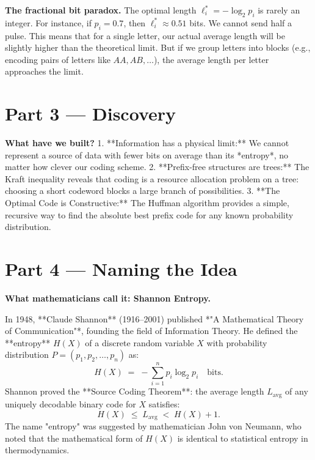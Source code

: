 \begin{thought}
\textbf{The fractional bit paradox.}
The optimal length $\ell_i^* = -\log_2 p_i$ is rarely an integer. For instance, if $p_i = 0.7$, then $\ell_i^* \approx 0.51$ bits. We cannot send half a pulse. This means that for a single letter, our actual average length will be slightly higher than the theoretical limit. But if we group letters into blocks (e.g., encoding pairs of letters like $AA, AB, \ldots$), the average length per letter approaches the limit.
\end{thought}

\section{Part 3 \texorpdfstring{---}{--} Discovery}

\begin{discoverybox}
\textbf{What have we built?}
1. **Information has a physical limit:** We cannot represent a source of data with fewer bits on average than its *entropy*, no matter how clever our coding scheme.
2. **Prefix-free structures are trees:** The Kraft inequality reveals that coding is a resource allocation problem on a tree: choosing a short codeword blocks a large branch of possibilities.
3. **The Optimal Code is Constructive:** The Huffman algorithm provides a simple, recursive way to find the absolute best prefix code for any known probability distribution.
\end{discoverybox}

\section{Part 4 \texorpdfstring{---}{--} Naming the Idea}

\begin{namebox}
\textbf{What mathematicians call it: Shannon Entropy.}

In 1948, **Claude Shannon** (1916–2001) published *"A Mathematical Theory of Communication"*, founding the field of Information Theory. He defined the **entropy** $H(X)$ of a discrete random variable $X$ with probability distribution $P = (p_1, p_2, \ldots, p_n)$ as:
\[
  H(X) \;=\; -\sum_{i=1}^{n} p_i \log_2 p_i \quad \text{bits}.
\]
Shannon proved the **Source Coding Theorem**: the average length $L_{\text{avg}}$ of any uniquely decodable binary code for $X$ satisfies:
\[
  H(X) \;\le\; L_{\text{avg}} \;<\; H(X) + 1.
\]
The name "entropy" was suggested by mathematician John von Neumann, who noted that the mathematical form of $H(X)$ is identical to statistical entropy in thermodynamics.
\end{namebox}

